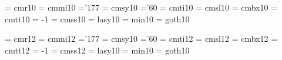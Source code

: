  \font\elvrm  = cmr10    \@halfmag %
 \font\elvmi  = cmmi10   \@halfmag %
    \skewchar\elvmi ='177          %
 \font\elvsy  = cmsy10   \@halfmag %
    \skewchar\elvsy ='60           %
 \font\elvit  = cmti10   \@halfmag %
 \font\elvsl  = cmsl10   \@halfmag %
 \font\elvbf  = cmbx10   \@halfmag %
 \font\elvtt  = cmtt10   \@halfmag %
    \hyphenchar\elvtt = -1         %
 \font\elvsf  = cmss10   \@halfmag %
 \font\elvly  = lasy10  \@halfmag %
\font\elvmin = min10    \@halfmag %
\font\elvgt = goth10	\@halfmag %

 \font\twlrm  = cmr12                 %
 \font\twlmi  = cmmi12               %
    \skewchar\twlmi ='177          %
 \font\twlsy  = cmsy10    %
    \skewchar\twlsy ='60           %
 \font\twlit  = cmti12               %
 \font\twlsl  = cmsl12               %
 \font\twlbf  = cmbx12               %
 \font\twltt  = cmtt12               %
    \hyphenchar\twltt = -1         %
 \font\twlsf  = cmss12               %
 \font\twlly  = lasy10   %
\font\twlmin = min10     %
\font\twlgt = goth10	 %

